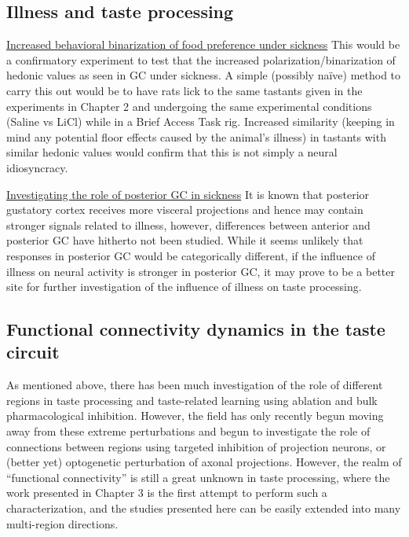 \begin{refsection}
\subsection{Illness and taste processing}

\smallskip
\noindent \underline{Increased behavioral binarization of food preference under sickness} This would be a confirmatory experiment to test that the increased polarization/binarization of hedonic values as seen in GC under sickness. A simple (possibly naïve) method to carry this out would be to have rats lick to the same tastants given in the experiments in Chapter 2 and undergoing the same experimental conditions (Saline vs LiCl) while in a Brief Access Task rig. Increased similarity (keeping in mind any potential floor effects caused by the animal’s illness) in tastants with similar hedonic values would confirm that this is not simply a neural idiosyncracy.

\smallskip
\noindent \underline{Investigating the role of posterior GC in sickness} It is known that posterior gustatory cortex receives more visceral projections and hence may contain stronger signals related to illness, however, differences between anterior and posterior GC have hitherto not been studied. While it seems unlikely that responses in posterior GC would be categorically different, if the influence of illness on neural activity is stronger in posterior GC, it may prove to be a better site for further investigation of the influence of illness on taste processing.

\subsection{Functional connectivity dynamics in the taste circuit}
As mentioned above, there has been much investigation of the role of different regions in taste processing and taste-related learning using ablation and bulk pharmacological inhibition. However, the field has only recently begun moving away from these extreme perturbations and begun to investigate the role of connections between regions using targeted inhibition of projection neurons, or (better yet) optogenetic perturbation of axonal projections. However, the realm of “functional connectivity” is still a great unknown in taste processing, where the work presented in Chapter 3 is the first attempt to perform such a characterization, and the studies presented here can be easily extended into many multi-region directions.


\end{refsection}
